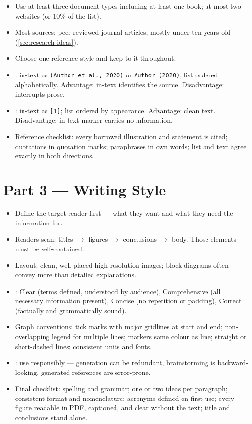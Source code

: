 \documentclass[../main.tex]{subfiles}
\begin{document}
\begin{itemize}
  \item Use at least three document types including at least one book; at most two websites (or 10\% of the list).
  \item Most sources: peer-reviewed journal articles, mostly under ten years old (\autoref{sec:research-ideas}).
  \item Choose one reference style and keep to it throughout.
  \item {}: in-text as \texttt{(Author et al., 2020)} or \texttt{Author (2020)}; list ordered alphabetically. Advantage: in-text identifies the source. Disadvantage: interrupts prose.
  \item {}: in-text as \texttt{[1]}; list ordered by appearance. Advantage: clean text. Disadvantage: in-text marker carries no information.
  \item Reference checklist: every borrowed illustration and statement is cited; quotations in quotation marks; paraphrases in own words; list and text agree exactly in both directions.
\end{itemize}

\section{Part 3 — Writing Style}
\label{sec:writing-style}

\begin{itemize}
  \item Define the target reader first — what they want and what they need the information for.
  \item Readers scan: titles $\to$ figures $\to$ conclusions $\to$ body. Those elements must be self-contained.
  \item Layout: clean, well-placed high-resolution images; block diagrams often convey more than detailed explanations.
  \item {}: Clear (terms defined, understood by audience), Comprehensive (all necessary information present), Concise (no repetition or padding), Correct (factually and grammatically sound).
  \item Graph conventions: tick marks with major gridlines at start and end; non-overlapping legend for multiple lines; markers same colour as line; straight or short-dashed lines; consistent units and fonts.
  \item {}: use responsibly — generation can be redundant, brainstorming is backward-looking, generated references are error-prone.
  \item Final checklist: spelling and grammar; one or two ideas per paragraph; consistent format and nomenclature; acronyms defined on first use; every figure readable in PDF, captioned, and clear without the text; title and conclusions stand alone.
\end{itemize}
\end{document}
